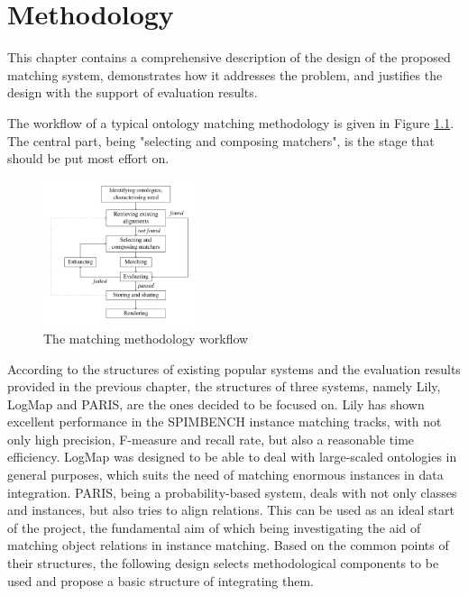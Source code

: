 \chapter{Methodology}

This chapter contains a comprehensive description of the design of the proposed matching system, demonstrates how it addresses the problem, and justifies the design with the support of evaluation results.

The workflow of a typical ontology matching methodology is given in Figure \ref{fig:methodology}. The central part, being "selecting and composing matchers", is the stage that should be put most effort on.

\begin{figure}[ht]
\begin{center}
\includegraphics[width=0.4\textwidth]{img/methodology.png}
\caption{The matching methodology workflow}
\label{fig:methodology}
\end{center}
\end{figure}

According to the structures of existing popular systems and the evaluation results provided in the previous chapter, the structures of three systems, namely Lily, LogMap and PARIS, are the ones decided to be focused on. Lily has shown excellent performance in the SPIMBENCH instance matching tracks, with not only high precision, F-measure and recall rate, but also a reasonable time efficiency. LogMap was designed to be able to deal with large-scaled ontologies in general purposes, which suits the need of matching enormous instances in data integration. PARIS, being a probability-based system, deals with not only classes and instances, but also tries to align relations. This can be used as an ideal start of the project, the fundamental aim of which being investigating the aid of matching object relations in instance matching. Based on the common points of their structures, the following design selects methodological components to be used and propose a basic structure of integrating them.

